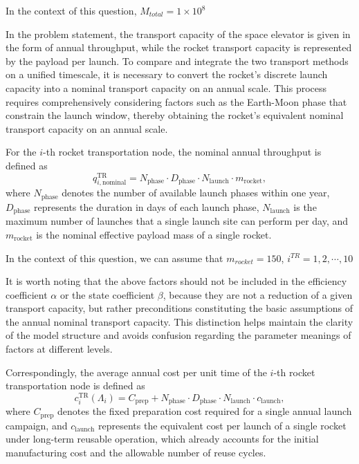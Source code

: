 \documentclass[12pt]{article}
\begin{document}
In the context of this question, $M_{total}=1\times 10^8$

In the problem statement, the transport capacity of the space elevator is given in the form of annual throughput, while the rocket transport capacity is represented by the payload per launch. To compare and integrate the two transport methods on a unified timescale, it is necessary to convert the rocket's discrete launch capacity into a nominal transport capacity on an annual scale. This process requires comprehensively considering factors such as the Earth-Moon phase that constrain the launch window, thereby obtaining the rocket's equivalent nominal transport capacity on an annual scale.

For the $i$-th rocket transportation node, the nominal annual throughput is defined as
\[
q_{i,\mathrm{nominal}}^{\mathrm{TR}}
= N_{\mathrm{phase}} \cdot D_{\mathrm{phase}} \cdot N_{\mathrm{launch}} \cdot m_{\mathrm{rocket}},
\]
where $N_{\mathrm{phase}}$ denotes the number of available launch phases within one year, $D_{\mathrm{phase}}$ represents the duration in days of each launch phase, $N_{\mathrm{launch}}$ is the maximum number of launches that a single launch site can perform per day, and $m_{\mathrm{rocket}}$ is the nominal effective payload mass of a single rocket.

In the context of this question, we can assume that $m_{rocket} = 150$, $i^{TR}=1,2, \cdots,10$

It is worth noting that the above factors should not be included in the efficiency coefficient $\alpha$ or the state coefficient $\beta$, because they are not a reduction of a given transport capacity, but rather preconditions constituting the basic assumptions of the annual nominal transport capacity. This distinction helps maintain the clarity of the model structure and avoids confusion regarding the parameter meanings of factors at different levels.

Correspondingly, the average annual cost per unit time of the $i$-th rocket transportation node is defined as
\[
c_i^{\mathrm{TR}}(\Lambda_i)
= C_{\mathrm{prep}} + N_{\mathrm{phase}} \cdot D_{\mathrm{phase}} \cdot N_{\mathrm{launch}} \cdot c_{\mathrm{launch}},
\]
where $C_{\mathrm{prep}}$ denotes the fixed preparation cost required for a single annual launch campaign, and $c_{\mathrm{launch}}$ represents the equivalent cost per launch of a single rocket under long-term reusable operation, which already accounts for the initial manufacturing cost and the allowable number of reuse cycles.
\end{document}
